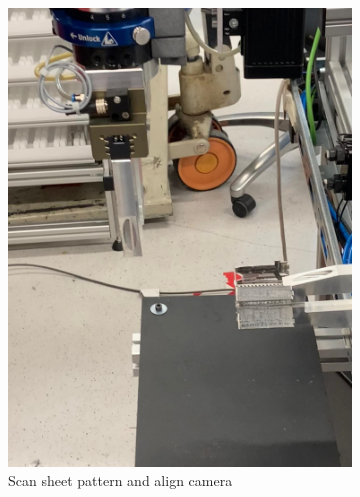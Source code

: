 \begin{figure}[h]
\begin{subfigure}[b]{0.32\textwidth}
        \includegraphics[width=\textwidth]{figures/sheet-pickup/sheet-placement03.png}
        \caption{Scan sheet pattern and align camera}
        \label{subfig:sheet-placement03}
    \end{subfigure}\hspace{0.1cm}
    \begin{subfigure}[b]{0.32\textwidth}
        \centering

\end{subfigure}
\end{figure}
